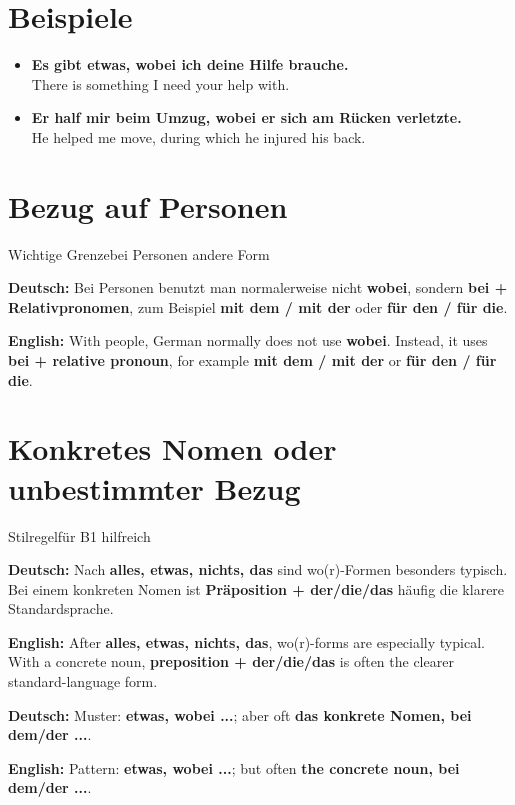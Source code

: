 \documentclass[a4paper,11pt]{article}
\newcommand{\GermanText}[1]{\textbf{Deutsch: }#1\par}
\newcommand{\EnglishText}[1]{{\small\color{SoftGray}\textbf{English: }#1\par}}
\newcommand{\ExampleItem}[2]{\item \textbf{#1}\\{\small\color{SoftGray}#2}}
\begin{document}
\section{Beispiele}

\begin{exbox}

\begin{itemize}

\ExampleItem{Es gibt etwas, wobei ich deine Hilfe brauche.}{There is something I need your help with.}

\ExampleItem{Er half mir beim Umzug, wobei er sich am Rücken verletzte.}{He helped me move, during which he injured his back.}

\end{itemize}

\end{exbox}

\section{Bezug auf Personen}

\begin{grammarentry}{Wichtige Grenze}{bei Personen andere Form}

\GermanText{Bei Personen benutzt man normalerweise nicht \textbf{wobei}, sondern \textbf{bei + Relativpronomen}, zum Beispiel \textbf{mit dem / mit der} oder \textbf{für den / für die}.}

\EnglishText{With people, German normally does not use \textbf{wobei}. Instead, it uses \textbf{bei + relative pronoun}, for example \textbf{mit dem / mit der} or \textbf{für den / für die}.}

\end{grammarentry}

\section{Konkretes Nomen oder unbestimmter Bezug}

\begin{grammarentry}{Stilregel}{für B1 hilfreich}

\GermanText{Nach \textbf{alles, etwas, nichts, das} sind wo(r)-Formen besonders typisch. Bei einem konkreten Nomen ist \textbf{Präposition + der/die/das} häufig die klarere Standardsprache.}

\EnglishText{After \textbf{alles, etwas, nichts, das}, wo(r)-forms are especially typical. With a concrete noun, \textbf{preposition + der/die/das} is often the clearer standard-language form.}

\GermanText{Muster: \textbf{etwas, wobei ...}; aber oft \textbf{das konkrete Nomen, bei dem/der ...}.}

\EnglishText{Pattern: \textbf{etwas, wobei ...}; but often \textbf{the concrete noun, bei dem/der ...}.}

\end{grammarentry}
\end{document}
